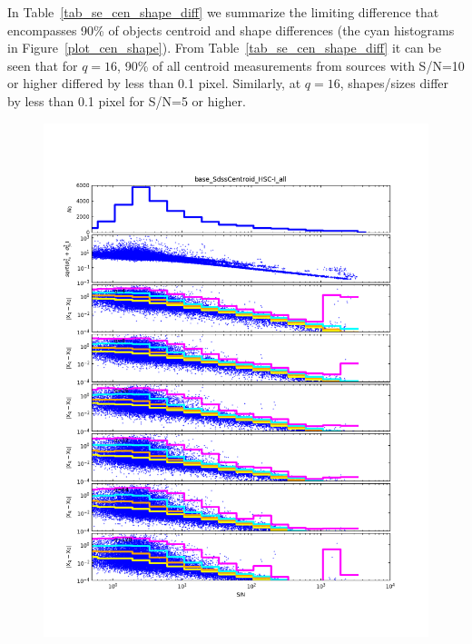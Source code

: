 In Table~\ref{tab_se_cen_shape_diff} we summarize the limiting difference that encompasses 90\% of 
objects centroid and shape differences (the cyan histograms in Figure~\ref{plot_cen_shape}).  
From Table~\ref{tab_se_cen_shape_diff} it can be seen
that for $q=16$, 90\% of all centroid measurements from sources with S/N=10 or higher differed by less
than 0.1 pixel.  Similarly, at $q=16$, shapes/sizes differ by less than 0.1 pixel for S/N=5 or higher.

\begin{figure}[t]
\centering
    \begin{minipage}{.49\textwidth}
        \centering
        \includegraphics[width=1.0\textwidth]{figure/rplot_all_base_SdssCentroid_HSC-I.png}
    \end{minipage}
    \begin{minipage}{.49\textwidth}
        \centering

\end{minipage}
\end{figure}
